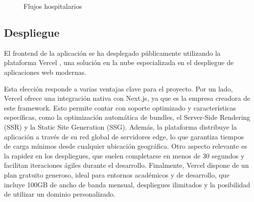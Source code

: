 \begin{figure}[H]
  \centering
  \caption{Flujos hospitalarios}
  \label{fig:chart-flows}
\end{figure}



\subsection{Despliegue}

El frontend de la aplicación se ha desplegado públicamente utilizando la plataforma Vercel \cite{vercel}, una solución en la nube especializada en el despliegue de aplicaciones web modernas. 

Esta elección responde a varias ventajas clave para el proyecto. Por un lado, Vercel ofrece una integración nativa con Next.js, ya que es la empresa creadora de este framework. Esto permite contar con soporte optimizado y características específicas, como la optimización automática de bundles, el Server-Side Rendering (SSR) y la Static Site Generation (SSG). Además, la plataforma distribuye la aplicación a través de su red global de servidores edge, lo que garantiza tiempos de carga mínimos desde cualquier ubicación geográfica. Otro aspecto relevante es la rapidez en los despliegues, que suelen completarse en menos de 30 segundos y facilitan iteraciones ágiles durante el desarrollo. Finalmente, Vercel dispone de un plan gratuito generoso, ideal para entornos académicos y de desarrollo, que incluye 100GB de ancho de banda mensual, despliegues ilimitados y la posibilidad de utilizar un dominio personalizado.

